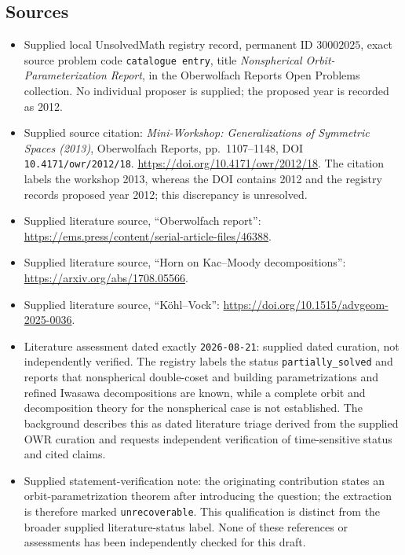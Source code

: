 \documentclass[11pt]{article}
\begin{document}
\subsection{Sources}
\begin{itemize}
\item Supplied local UnsolvedMath registry record, permanent ID \(30002025\), exact source problem code \texttt{catalogue entry}, title \emph{Nonspherical Orbit-Parameterization Report}, in the Oberwolfach Reports Open Problems collection. No individual proposer is supplied; the proposed year is recorded as 2012.
\item Supplied source citation: \emph{Mini-Workshop: Generalizations of Symmetric Spaces (2013)}, Oberwolfach Reports, pp.~1107--1148, DOI \texttt{10.4171/owr/2012/18}. \url{https://doi.org/10.4171/owr/2012/18}. The citation labels the workshop 2013, whereas the DOI contains 2012 and the registry records proposed year 2012; this discrepancy is unresolved.
\item Supplied literature source, ``Oberwolfach report'': \url{https://ems.press/content/serial-article-files/46388}.
\item Supplied literature source, ``Horn on Kac--Moody decompositions'': \url{https://arxiv.org/abs/1708.05566}.
\item Supplied literature source, ``Köhl--Vock'': \url{https://doi.org/10.1515/advgeom-2025-0036}.
\item Literature assessment dated exactly \texttt{2026-08-21}: supplied dated curation, not independently verified. The registry labels the status \texttt{partially\_solved} and reports that nonspherical double-coset and building parametrizations and refined Iwasawa decompositions are known, while a complete orbit and decomposition theory for the nonspherical case is not established. The background describes this as dated literature triage derived from the supplied OWR curation and requests independent verification of time-sensitive status and cited claims.
\item Supplied statement-verification note: the originating contribution states an orbit-parametrization theorem after introducing the question; the extraction is therefore marked \texttt{unrecoverable}. This qualification is distinct from the broader supplied literature-status label. None of these references or assessments has been independently checked for this draft.
\end{itemize}
\end{document}
